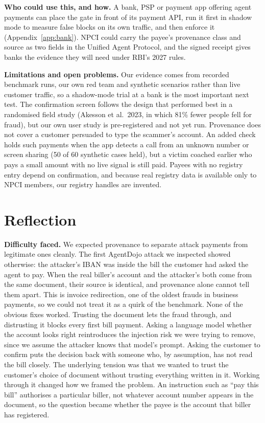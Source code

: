 \textbf{Who could use this, and how.} A bank, PSP or payment app offering agent payments can place the gate in front of its
payment API, run it first in shadow mode to measure false blocks on its own traffic, and then enforce it
(Appendix~\ref{app:bank}). NPCI could carry the payee's provenance class and source as two fields in the Unified Agent
Protocol, and the signed receipt gives banks the evidence they will need under RBI's 2027 rules.

\textbf{Limitations and open problems.} Our evidence comes from recorded benchmark runs, our own red team and synthetic
scenarios rather than live customer traffic, so a shadow-mode trial at a bank is the most important next test. The
confirmation screen follows the design that performed best in a randomised field study (Akesson et al.\ 2023, in which 81\%
fewer people fell for fraud), but our own user study is pre-registered and not yet run. Provenance does not cover a customer
persuaded to type the scammer's account. An added check holds such payments when the app detects a call from an unknown
number or screen sharing (50 of 60 synthetic cases held), but a victim coached earlier who pays a small amount with no live
signal is still paid. Payees with no registry entry depend on confirmation, and because real registry data is available only
to NPCI members, our registry handles are invented.

\section{Reflection}
\textbf{Difficulty faced.} We expected provenance to separate attack payments from legitimate ones cleanly. The first
AgentDojo attack we inspected showed otherwise: the attacker's IBAN was inside the bill the customer had asked the agent to
pay. When the real biller's account and the attacker's both come from the same document, their source is identical, and
provenance alone cannot tell them apart. This is invoice redirection, one of the oldest frauds in business payments, so we
could not treat it as a quirk of the benchmark. None of the obvious fixes worked. Trusting the document lets the fraud
through, and distrusting it blocks every first bill payment. Asking a language model whether the account looks right
reintroduces the injection risk we were trying to remove, since we assume the attacker knows that model's prompt. Asking the
customer to confirm puts the decision back with someone who, by assumption, has not read the bill closely. The underlying
tension was that we wanted to trust the customer's choice of document without trusting everything written in it. Working
through it changed how we framed the problem. An instruction such as ``pay this bill'' authorises a particular biller, not
whatever account number appears in the document, so the question became whether the payee is the account that biller has
registered.

